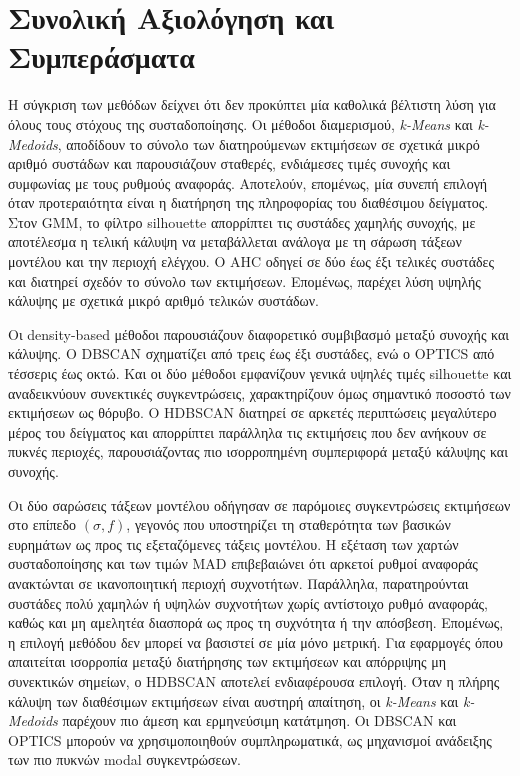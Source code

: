 \chapter{Συνολική Αξιολόγηση και Συμπεράσματα}

Η σύγκριση των μεθόδων δείχνει ότι δεν προκύπτει μία καθολικά βέλτιστη
λύση για όλους τους στόχους της συσταδοποίησης. Οι μέθοδοι
διαμερισμού, \textenglish{\textit{k-Means}} και \textenglish{\textit{k-Medoids}}, αποδίδουν το σύνολο
των διατηρούμενων εκτιμήσεων σε σχετικά μικρό αριθμό συστάδων και παρουσιάζουν
σταθερές, ενδιάμεσες τιμές συνοχής και συμφωνίας με τους ρυθμούς αναφοράς.
Αποτελούν, επομένως, μία συνεπή επιλογή όταν προτεραιότητα είναι η
διατήρηση της πληροφορίας του διαθέσιμου δείγματος. Στον GMM, το φίλτρο
silhouette απορρίπτει τις συστάδες χαμηλής συνοχής, με αποτέλεσμα η τελική
κάλυψη να μεταβάλλεται ανάλογα με τη σάρωση τάξεων μοντέλου και την περιοχή ελέγχου.
Ο AHC οδηγεί σε δύο έως έξι τελικές συστάδες και διατηρεί σχεδόν το σύνολο
των εκτιμήσεων. Επομένως, παρέχει λύση υψηλής κάλυψης με σχετικά μικρό
αριθμό τελικών συστάδων.

Οι density-based μέθοδοι παρουσιάζουν διαφορετικό συμβιβασμό μεταξύ
συνοχής και κάλυψης. Ο DBSCAN σχηματίζει από τρεις έως έξι συστάδες, ενώ ο
OPTICS από τέσσερις έως οκτώ. Και οι δύο μέθοδοι εμφανίζουν γενικά υψηλές τιμές
silhouette και αναδεικνύουν συνεκτικές συγκεντρώσεις, χαρακτηρίζουν
όμως σημαντικό ποσοστό των εκτιμήσεων ως θόρυβο. Ο HDBSCAN διατηρεί
σε αρκετές περιπτώσεις μεγαλύτερο μέρος του δείγματος και απορρίπτει παράλληλα τις εκτιμήσεις που
δεν ανήκουν σε πυκνές περιοχές, παρουσιάζοντας πιο ισορροπημένη
συμπεριφορά μεταξύ κάλυψης και συνοχής.

Οι δύο σαρώσεις τάξεων μοντέλου οδήγησαν σε παρόμοιες συγκεντρώσεις
εκτιμήσεων στο επίπεδο $(\sigma,f)$, γεγονός που υποστηρίζει τη σταθερότητα
των βασικών ευρημάτων ως προς τις εξεταζόμενες τάξεις μοντέλου. Η εξέταση
των χαρτών συσταδοποίησης και των τιμών MAD επιβεβαιώνει ότι αρκετοί
ρυθμοί αναφοράς ανακτώνται σε ικανοποιητική περιοχή συχνοτήτων. Παράλληλα,
παρατηρούνται συστάδες πολύ χαμηλών ή υψηλών συχνοτήτων χωρίς αντίστοιχο
ρυ\-θμό αναφοράς, καθώς και μη αμελητέα διασπορά ως προς τη συχνότητα ή την
απόσβεση. Επομένως, η επιλογή μεθόδου δεν μπορεί να βασιστεί σε μία μόνο
μετρική. Για εφαρμογές όπου απαιτείται ισορροπία μεταξύ διατήρησης των
εκτιμήσεων και απόρριψης μη συνεκτικών σημείων, ο HDBSCAN αποτελεί
ενδιαφέρουσα επιλογή. Όταν η πλήρης κάλυψη των διαθέσιμων εκτιμήσεων είναι
αυστηρή απαίτηση, οι \textenglish{\textit{k-Means}} και \textenglish{\textit{k-Medoids}} παρέχουν πιο
άμεση και ερμηνεύσιμη κατάτμηση. Οι DBSCAN και OPTICS μπορούν να
χρησιμοποιηθούν συμπληρωματικά, ως μηχανισμοί ανάδειξης των πιο πυκνών
modal συγκεντρώσεων.


